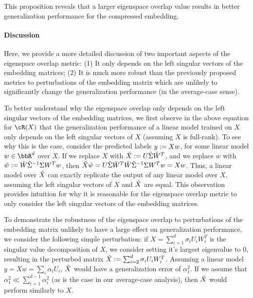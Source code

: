 This proposition reveals that a larger eigenspace overlap value results in better generalization performance for the compressed embedding.

\paragraph{Discussion}
Here, we provide a more detailed discussion of two important aspects of the eigenspace overlap metric:
(1) It only depends on the left singular vectors of the embedding matrices;
(2) It is much more robust than the previously proposed metrics to perturbations of the embedding matrix which are unlikely to significantly change the generalization performance (in the average-case sense).

To better understand why the eigenspace overlap only depends on the left singular vectors of the embedding matrices, we first observe in the above equation for $\cR(X)$ that the generalization performance of a linear model trained on $X$ only depends on the left singular vectors of $X$ (assuming $X$ is full-rank).
To see why this is the case, consider the predicted labels $y \defeq Xw$, for some linear model $w \in \RR^d$ over $X$.
If we replace $X$ with $\tX \defeq U \tSigma \tW^T$, and we replace $w$ with $\tw \defeq \tW \tSigma^{-1} \Sigma W^T w$, then $\tX \tw = U\tSigma \tW^T \tW \tSigma^{-1} \Sigma W^T w = Xw$.
Thus, a linear model over $\tX$ can exactly replicate the output of any linear model over $X$, assuming the left singular vectors of $X$ and $\tX$ are equal.
This observation provides intuition for why it is reasonable for the eigenspace overlap metric to only consider the left singular vectors of the embedding matrices.

To demonstrate the robustness of the eigenspace overlap to perturbations of the embedding matrix unlikely to have a large effect on generalization performance, we consider the following simple perturbation:
if $X = \sum_{i=1}^{d} \sigma_i U_i W_i^T$ is the singular value decomposition of $X$, we consider setting it's largest eigenvalue to 0, resulting in the perturbed matrix $\tX \defeq \sum_{i=2}^{d} \sigma_i U_i W_i^T$.
Assuming a linear model $y = Xw = \sum_i \alpha_i U_i$, $\tX$ would have a generalization error of $\alpha_1^2$.
If we assume that $\alpha_1^2 \ll \sum_{i=1}^{d-1}\alpha_i^2$ (as is the case in our average-case analysis), then $\tX$ would perform similarly to $X$.

